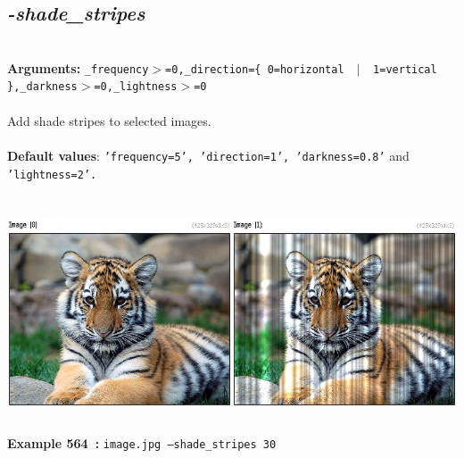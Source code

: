 \documentclass[a4paper,11pt,twoside]{book}
\begin{document}
\subsection{\emph{-shade\_stripes} }\vspace*{-0.5em}
~\\\textbf{Arguments: } 
{\small \texttt{\_frequency$>$=0,\_direction=\{ 0=horizontal ~$|$~ 1=vertical \},\_darkness$>$=0,\_lightness$>$=0}}\\~\\
Add shade stripes to selected images.
~\\~\\\textbf{Default values}: {\small \texttt{'frequency=5', 'direction=1', 'darkness=0.8'} and \texttt{'lightness=2'.}}
\begin{center}\includegraphics[keepaspectratio=true,height=7cm,width=\textwidth]{img/gmic_def564.jpg}\\
{\footnotesize \textbf{Example 564~:} \texttt{image.jpg --shade\_stripes 30}}
\end{center}
\end{document}
